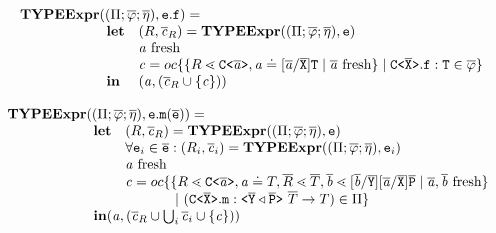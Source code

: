 \documentclass[a4paper,USenglish,cleveref, autoref, thm-restate]{lipics-v2021}
\begin{document}
\begin{gather*}
  \begin{array}{@{}l@{}l}
    \typeExpr{} &(({\mtypeEnvironment} ; \overline{\fieldAssumption};
                  \overline{\localVarAssumption}), \texttt{e}.\texttt{f}) = \\
                & \begin{array}{ll}
                    \textbf{let} 
                    & ({R}, \consSet_R) = \typeExpr(({\mtypeEnvironment} ; \overline{\fieldAssumption};
                      \overline{\localVarAssumption}), \texttt{e})\\
                    & \tv{a} \text{ fresh} \\
                    & \constraint = \orCons\set{
                      \set{
                      {R} \lessdot \exptype{C}{\ol{\tv{a}}} , \tv{a} \doteq
                      [\overline{\tv{a}}/\ol{X}]\type{T}
                      \mid \overline{\tv{a}} \text{ fresh}
                      }
                      \mid \exptype{C}{\ol{X}}.\mv{f} : \mv{T} \in \ol{\fieldAssumption}
                      }\\
                    {\mathbf{in}} & {
                    (\tv{a}, (\consSet_R \cup \set{\constraint}))}
                  \end{array} 
  \end{array}
\end{gather*}

\noindent
$\begin{array}{@{}l@{}l}
\typeExpr{} & (({\mtypeEnvironment} ; \overline{\fieldAssumption};
  \overline{\localVarAssumption}), \texttt{e}.\mathtt{m}(\overline{\texttt{e}}) ) = \\
& \begin{array}{ll}
\textbf{let}& %
({R}, \consSet_R) = \typeExpr(({\mtypeEnvironment} ; \overline{\fieldAssumption};
  \overline{\localVarAssumption}), \texttt{e})\\
& \forall \texttt{e}_i \in \ol{e} : (R_i, \consSet_i) = \typeExpr(({\mtypeEnvironment} ; \overline{\fieldAssumption};
  \overline{\localVarAssumption}), \texttt{e}_i)  \\
                    & \tv{a} \text{ fresh} \\
& \begin{array}{@{}l@{}l}
  \constraint = \orCons\set{ & \set{{R} \lessdot \exptype{C}{\ol{\tv{a}}}, \tv{a} \doteq {T},
                                \overline{R} \lessdot \overline{T} , \ol{\tv{b}} \lessdot
                                [\ol{\tv{b}}/\ol{Y}][\ol{\tv{a}}/\ol{X}]\ol{P} \mid \overline{\tv{a}}, \overline{\tv{b}} \text{ fresh}}\\
  & \ |\ (\exptype{C}{\ol{X}}.\texttt{m} : \exptype{}{\ol{Y} \triangleleft \ol{P}} \ \overline{T} \to {T}) \in {\mtypeEnvironment} }
\end{array}\\
\multicolumn{2}{l}{\mathbf{in} (\tv{a},(\consSet_R \cup \bigcup_i \consSet_i \cup \set{\constraint}))}
\end{array}
\end{array}
$
\end{document}
